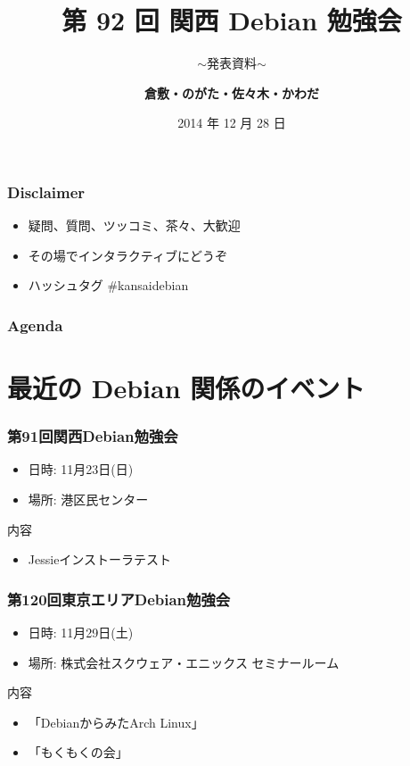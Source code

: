 \documentclass[cjk,dvipdfmx,10pt,compress,%
hyperref={bookmarks=true,bookmarksnumbered=true,bookmarksopen=false,%
colorlinks=false,%
pdftitle={第 92 回 関西 Debian 勉強会},%
pdfauthor={倉敷・のがた・佐々木・かわだ},%
pdfsubject={資料},%
}]{beamer}
\title{第 92 回 関西 Debian 勉強会}
\subtitle{$\sim$発表資料$\sim$}
\author[かわだ てつたろう]{{\large\bf 倉敷・のがた・佐々木・かわだ}}
\institute[Debian JP]{{\normalsize\tt 関西 Debian 勉強会}}
\date{{\small 2014 年 12 月 28 日}}
\begin{document}
\settitleslide
\begin{frame}
\titlepage
\end{frame}
\setdefaultslide

\begin{frame}[fragile]
  \frametitle{Disclaimer}
  \begin{itemize}
  \item 疑問、質問、ツッコミ、茶々、\alert{大歓迎}
  \item その場でインタラクティブにどうぞ
  \item ハッシュタグ \#kansaidebian
\end{itemize}
\end{frame}

\begin{frame}[fragile]
\frametitle{Agenda}

\tableofcontents

\end{frame}

\section{最近の Debian 関係のイベント}


\begin{frame}[fragile]
  \frametitle{第91回関西Debian勉強会}
  \begin{itemize}
  \item 日時: 11月23日(日)
  \item 場所: 港区民センター
  \end{itemize}
  \begin{block}{内容}
    \begin{itemize}
    \item Jessieインストーラテスト
    \end{itemize}
  \end{block}
\end{frame}

\begin{frame}[fragile]
  \frametitle{第120回東京エリアDebian勉強会}
  \begin{itemize}
  \item 日時: 11月29日(土)
  \item 場所: 株式会社スクウェア・エニックス セミナールーム
  \end{itemize}
  \begin{block}{内容}
    \begin{itemize}
    \item 「DebianからみたArch Linux」
    \item 「もくもくの会」
    \end{itemize}
  \end{block}
\end{frame}
\end{document}
